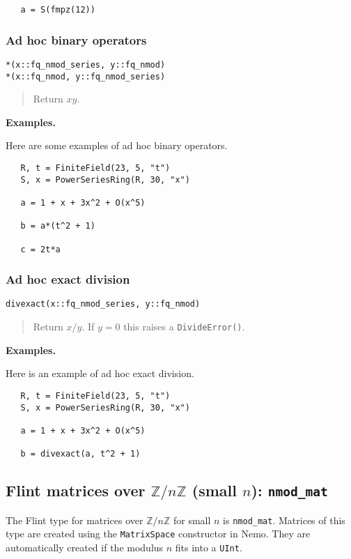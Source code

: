 \documentclass[a4paper,10pt]{article}
\newcommand{\Z}{\mathbb{Z}}
\newcommand{\code}{\lstinline}
\newcommand{\desc}[1]{\vspace{-3mm}\begin{quote}#1\end{quote}}
\begin{document}
{{\begin{lstlisting}
   a = S(fmpz(12))
\end{lstlisting}

\subsubsection{Ad hoc binary operators}

\begin{lstlisting}
*(x::fq_nmod_series, y::fq_nmod)
*(x::fq_nmod, y::fq_nmod_series)
\end{lstlisting}

\desc{Return $xy$.}

\textbf{Examples.}

Here are some examples of ad hoc binary operators.

\begin{lstlisting}
   R, t = FiniteField(23, 5, "t")
   S, x = PowerSeriesRing(R, 30, "x")

   a = 1 + x + 3x^2 + O(x^5)
   
   b = a*(t^2 + 1)

   c = 2t*a
\end{lstlisting}

\subsubsection{Ad hoc exact division}

\begin{lstlisting}
divexact(x::fq_nmod_series, y::fq_nmod)
\end{lstlisting}

\desc{Return $x/y$. If $y = 0$ this raises a \code{DivideError()}.}

\textbf{Examples.}

Here is an example of ad hoc exact division.

\begin{lstlisting}
   R, t = FiniteField(23, 5, "t")
   S, x = PowerSeriesRing(R, 30, "x")

   a = 1 + x + 3x^2 + O(x^5)
   
   b = divexact(a, t^2 + 1)
\end{lstlisting}

\subsection{Flint matrices over $\Z/n\Z$ (small $n$): \code{nmod_mat}}

The Flint type for matrices over $\Z/n\Z$ for small $n$ is \code{nmod_mat}. Matrices
of this type are created using the \code{MatrixSpace} constructor in Nemo. They are
automatically created if the modulus $n$ fits into a \code{UInt}.

}}
\end{document}
